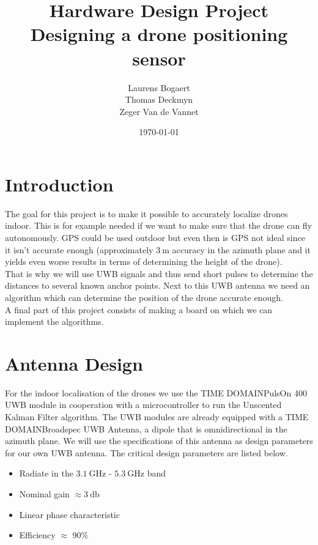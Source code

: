 \documentclass[a4paper]{article}        %
\title{Hardware Design Project\\ Designing a drone positioning sensor}
\author{Laurens Bogaert\\Thomas Deckmyn\\Zeger Van de Vannet}
\date{\today}
\begin{document}
\maketitle

\newpage
  \tableofcontents
\newpage

\section{Introduction}

The goal for this project is to make it possible to accurately localize drones indoor. This is for example needed if we want to make sure that the drone can fly autonomously. GPS could be used outdoor but even then is GPS not ideal since it isn't accurate enough (approximately $\SI{3}{\meter}$ accuracy in the azimuth plane and it yields even worse results in terms of determining the height of the drone). \\
That is why we will use UWB signals and thus send short pulses to determine the distances to several known anchor points. Next to this UWB antenna we need an algorithm which can determine the position of the drone accurate enough. \\
A final part of this project consists of making a board on which we can implement the algorithms.

\section{Antenna Design}
	
	For the indoor localisation of the drones we use the TIME DOMAIN\texttrademark PulsOn 400 UWB module in cooperation with a microcontroller to run the Unscented Kalman Filter algorithm. The UWB modules are already equipped with a TIME DOMAIN\texttrademark Broadspec UWB Antenna, a dipole that is omnidirectional in the azimuth plane. We will use the specifications of this antenna as design parameters for our own UWB antenna. The critical design parameters are listed below. 

	\begin{itemize}
		\item Radiate in the $\SI{3.1}{\giga\hertz}$ - $\SI{5.3}{\giga\hertz}$ band
		\item Nominal gain $\approx \SI{3}{\decibel}$
		\item Linear phase characteristic
		\item Efficiency $\approx$ 90\%	

	\end{itemize}
\end{document}
